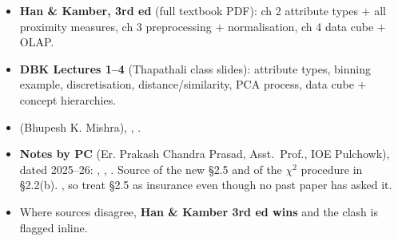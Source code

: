 \begin{itemize}
  \item \textbf{Han \& Kamber, 3rd ed} (full textbook PDF): ch 2 attribute types $+$ all proximity
        measures, ch 3 preprocessing $+$ normalisation, ch 4 data cube $+$ OLAP. 
  \item \textbf{DBK Lectures 1--4} (Thapathali class slides): attribute types, binning example,
        discretisation, distance/similarity, PCA process, data cube $+$ concept hierarchies.
  \item {} (Bhupesh K. Mishra), ,
        .
  \item \textbf{Notes by PC} (Er. Prakash Chandra Prasad, Asst.\ Prof., IOE Pulchowk), dated
        2025--26: , ,
        . Source of the new §2.5 and of the
        $\chi^2$ procedure in §2.2(b). , so treat §2.5 as
        insurance even though no past paper has asked it.
  \item Where sources disagree, \textbf{Han \& Kamber 3rd ed wins} and the clash is flagged inline.
\end{itemize}
